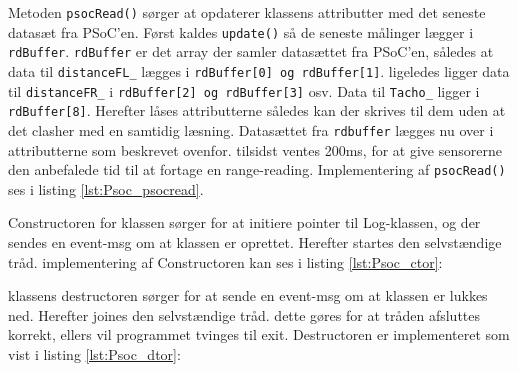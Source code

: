 

\clearpage

Metoden \texttt{psocRead()} sørger at opdaterer klassens attributter med det seneste datasæt fra PSoC'en. Først kaldes \texttt{update()} så de seneste målinger lægger i \texttt{rdBuffer}. \texttt{rdBuffer} er det array der samler datasættet fra PSoC'en, således at data til \texttt{distanceFL\_} lægges i \texttt{rdBuffer[0] og rdBuffer[1]}. ligeledes ligger data til \texttt{distanceFR\_} i \texttt{rdBuffer[2] og rdBuffer[3]} osv. Data til \texttt{Tacho\_} ligger i \texttt{rdBuffer[8]}. Herefter låses attributterne således kan der skrives til dem uden at det clasher med en samtidig læsning. Datasættet fra \texttt{rdbuffer} lægges nu over i attributterne som beskrevet ovenfor. tilsidst ventes 200ms, for at give sensorerne den anbefalede tid til at fortage en range-reading. Implementering af \texttt{psocRead()} ses i listing \ref{lst:Psoc_psocread}.



\clearpage

Constructoren for klassen sørger for at initiere pointer til Log-klassen, og der sendes en event-msg om at klassen er oprettet. Herefter startes den selvstændige tråd. implementering af Constructoren kan ses i listing \ref{lst:Psoc_ctor}:




klassens destructoren sørger for at sende en event-msg om at klassen er lukkes ned. Herefter joines den selvstændige tråd. dette gøres for at tråden afsluttes korrekt, ellers vil programmet tvinges til exit. Destructoren er implementeret som vist i listing \ref{lst:Psoc_dtor}:


